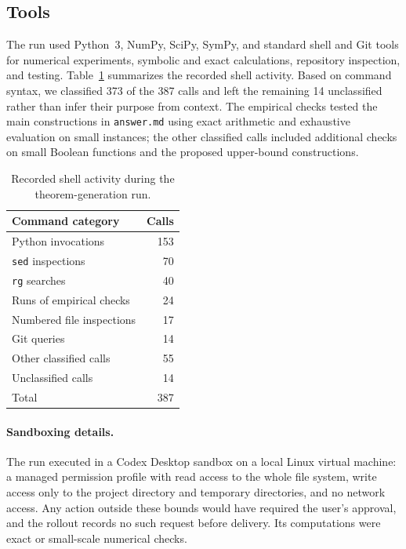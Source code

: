 \documentclass{article}
\theoremstyle{definition}
\theoremstyle{plain}
\begin{document}
\subsection{Tools}
\label{subsec:tools}


The run used Python~3, NumPy, SciPy, SymPy, and standard shell and Git tools for numerical experiments, symbolic and exact calculations, repository inspection, and testing. Table~\ref{tab:tool-usage} summarizes the recorded shell activity. Based on command syntax, we classified 373 of the 387 calls and left the remaining 14 unclassified rather than infer their purpose from context. The empirical checks tested the main constructions in \texttt{answer.md} using exact arithmetic and exhaustive evaluation on small instances; the other classified calls included additional checks on small Boolean functions and the proposed upper-bound constructions.

\begin{table}[H]
  \caption{Recorded shell activity during the theorem-generation run.}
  \label{tab:tool-usage}
  \centering
  \small
  \begin{tabular}{lr}
    \toprule
    Command category & Calls \\
    \midrule
    Python invocations & 153 \\
    \texttt{sed} inspections & 70 \\
    \texttt{rg} searches & 40 \\
    Runs of empirical checks & 24 \\
    Numbered file inspections & 17 \\
    Git queries & 14 \\
    Other classified calls & 55 \\
    Unclassified calls & 14 \\
    \midrule
    Total & 387 \\
    \bottomrule
  \end{tabular}
\end{table}

\paragraph{Sandboxing details.} The run executed in a Codex Desktop sandbox on a local Linux virtual machine: a managed permission profile with read access to the whole file system, write access only to the project directory and temporary directories, and no network access. Any action outside these bounds would have required the user's approval, and the rollout records no such request before delivery. Its computations were exact or small-scale numerical checks.
\end{document}
